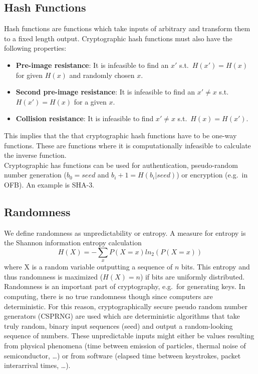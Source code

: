 \subsection{Hash Functions}
Hash functions are functions which take inputs of arbitrary and transform them to a fixed length output.
Cryptographic hash functions must also have the following properties:
\begin{itemize}
  \item \textbf{Pre-image resistance}: It is infeasible to find an $x'$ s.t.\ $H(x') = H(x)$ for given $H(x)$ and randomly chosen $x$.
  \item \textbf{Second pre-image resistance}: It is infeasible to find an $x' \neq x$ s.t.\ $H(x') = H(x)$ for a given $x$.
  \item \textbf{Collision resistance}: It is infeasible to find $x' \neq x$ s.t.\ $H(x) = H(x')$.
\end{itemize}
This implies that the that cryptographic hash functions have to be one-way functions.
These are functions where it is computationally infeasible to calculate the inverse function.\\

Cryptographic has functions can be used for authentication, pseudo-random number generation ($b_0 = seed$ and $b_i+1 = H(b_i|seed)$) or encryption (e.g.\ in OFB).
An example is SHA-3.

\subsection{Randomness}
We define randomness as unpredictability or entropy.
A measure for entropy is the Shannon information entropy calculation
\begin{equation*}
  H(X) = - \sum_x P(X = x)ln_2(P(X=x))
\end{equation*}
where X is a random variable outputting a sequence of $n$ bits.
This entropy and thus randomness is maximized ($H(X) = n$) if bits are uniformly distributed.\\

Randomness is an important part of cryptography, e.g.\ for generating keys.
In computing, there is no true randomness though since computers are deterministic.
For this reason, cryptographically secure pseudo random number generators (CSPRNG) are used which are deterministic algorithms that take truly random, binary input sequences (seed) and output a random-looking sequence of numbers.
These unpredictable inputs might either be values resulting from physical phenomena (time between emission of particles, thermal noise of semiconductor, \dots) or from software (elapsed time between keystrokes, packet interarrival times, \dots).


